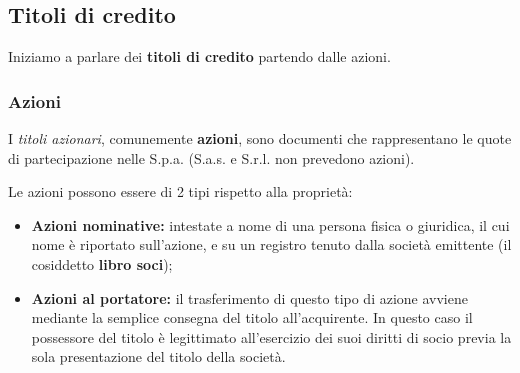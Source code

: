 \documentclass[a4paper,11pt]{article}
\begin{document}
\subsection{Titoli di credito}
Iniziamo a parlare dei \textbf{titoli di credito} partendo dalle azioni.

\subsubsection{Azioni}
I \textit{titoli azionari}, comunemente \textbf{azioni}, sono documenti che rappresentano le quote di partecipazione nelle S.p.a. (S.a.s. e S.r.l. non prevedono azioni).

Le azioni possono essere di 2 tipi rispetto alla proprietà:
\begin{itemize}
	\item \textbf{Azioni nominative:} intestate a nome di una persona fisica o giuridica, il cui nome è riportato sull'azione, e su un registro tenuto dalla società emittente (il cosiddetto \textbf{libro soci});
	\item \textbf{Azioni al portatore:} il trasferimento di questo tipo di azione avviene mediante la semplice consegna del titolo all'acquirente. In questo caso il possessore del titolo è legittimato all'esercizio dei suoi diritti di socio previa la sola presentazione del titolo della società. 
\end{itemize}
\end{document}
